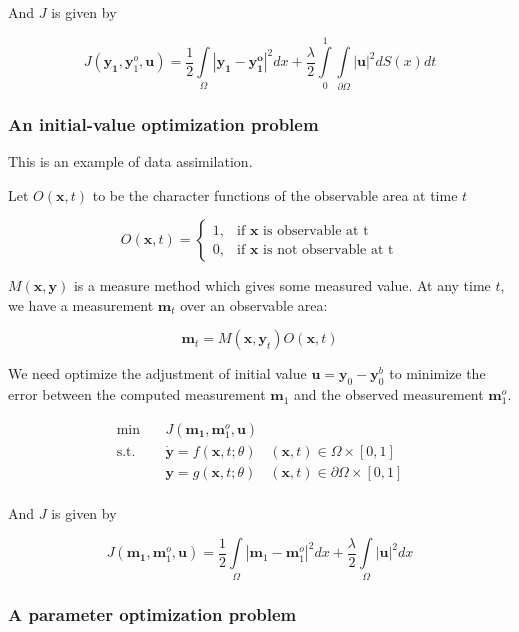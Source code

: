 \documentclass{article}
\begin{document}
And $ J $ is given by

$$
J(\mathbf{y_1}, \mathbf{y}_1^o, \mathbf{u}) = \frac{1}{2} \int\limits_{\Omega}|\mathbf{y_1} - \mathbf{y_1^o}|^2dx +  \frac{\lambda}{2} \int\limits_{0}^{1}\int\limits_{\partial \Omega} |\mathbf{u}|^2 dS(x) dt
$$

\subsubsection{An initial-value optimization problem}

This is an example of data assimilation.

Let $ O(\mathbf{x}, t) $ to be the character functions of the observable area at time $t$

$$
O(\mathbf{x}, t) = \begin{cases}
1, & \text{if }\mathbf{x}\text{ is observable at t} \\
0, & \text{if }\mathbf{x}\text{ is not observable at t}
\end{cases}
$$

$ M(\mathbf{x}, \mathbf{y}) $ is a measure method which gives some measured value. At any time $ t $, we have a measurement $\mathbf{m}_t$ over an observable area:

$$ \mathbf{m}_t = M(\mathbf{x}, \mathbf{y}_t) O(\mathbf{x}, t) $$

We need optimize the adjustment of initial value $ \mathbf{u} = \mathbf{y}_0 - \mathbf{y}_0^b $  to minimize the error between the computed measurement $ \mathbf{m}_1 $ and the observed measurement $ \mathbf{m}_1^o $.

$$
\begin{array}{rcll}
\min &~& J(\mathbf{m_1}, \mathbf{m}_1^o, \mathbf{u}) & \\
\mathrm{s.t.} &~& \dot{\mathbf{y}} = f(\mathbf{x}, t; \theta) & (\mathbf{x}, t) \in \Omega \times [0, 1] \\
&~& \mathbf{y} = g(\mathbf{x}, t; \theta) & (\mathbf{x}, t) \in \partial \Omega \times [0, 1] \\
\end{array}
$$

And $ J $ is given by

$$
J(\mathbf{m_1}, \mathbf{m}_1^o, \mathbf{u}) = \frac{1}{2} \int\limits_{\Omega}|\mathbf{m}_1 - \mathbf{m}_1^o|^2 dx + \frac{\lambda}{2} \int\limits_{\Omega}|\mathbf{u}|^2 dx
$$

\subsubsection{A parameter optimization problem}
\end{document}
